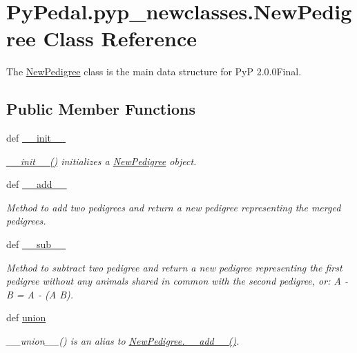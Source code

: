 \hypertarget{classPyPedal_1_1pyp__newclasses_1_1NewPedigree}{
\section{PyPedal.pyp\_\-newclasses.NewPedigree Class Reference}
\label{classPyPedal_1_1pyp__newclasses_1_1NewPedigree}
}


The \hyperlink{classPyPedal_1_1pyp__newclasses_1_1NewPedigree}{NewPedigree} class is the main data structure for PyP 2.0.0Final.  


\subsection*{Public Member Functions}
\begin{DoxyCompactItemize}
\item 
def \hyperlink{classPyPedal_1_1pyp__newclasses_1_1NewPedigree_ad6a2650eb959399a93d9c445b53a5b10}{\_\-\_\-init\_\-\_\-}
\begin{DoxyCompactList}\small\item\em \hyperlink{classPyPedal_1_1pyp__newclasses_1_1NewPedigree_ad6a2650eb959399a93d9c445b53a5b10}{\_\-\_\-init\_\-\_\-()} initializes a \hyperlink{classPyPedal_1_1pyp__newclasses_1_1NewPedigree}{NewPedigree} object. \end{DoxyCompactList}\item 
def \hyperlink{classPyPedal_1_1pyp__newclasses_1_1NewPedigree_a8e61f8a2dd95d5e0eb3c8ed0ad5dfc01}{\_\-\_\-add\_\-\_\-}
\begin{DoxyCompactList}\small\item\em Method to add two pedigrees and return a new pedigree representing the merged pedigrees. \end{DoxyCompactList}\item 
def \hyperlink{classPyPedal_1_1pyp__newclasses_1_1NewPedigree_a422caca98648557dd76722f135751e5e}{\_\-\_\-sub\_\-\_\-}
\begin{DoxyCompactList}\small\item\em Method to subtract two pedigree and return a new pedigree representing the first pedigree without any animals shared in common with the second pedigree, or: A -\/ B = A -\/ (A  B). \end{DoxyCompactList}\item 
def \hyperlink{classPyPedal_1_1pyp__newclasses_1_1NewPedigree_a919f89374a53fbd6bcc6556ca7f29b95}{union}
\begin{DoxyCompactList}\small\item\em \_\-\_\-union\_\-\_\-() is an alias to \hyperlink{classPyPedal_1_1pyp__newclasses_1_1NewPedigree_a8e61f8a2dd95d5e0eb3c8ed0ad5dfc01}{NewPedigree.\_\-\_\-add\_\-\_\-()}. \end{DoxyCompactList}\item 

\end{DoxyCompactItemize}
